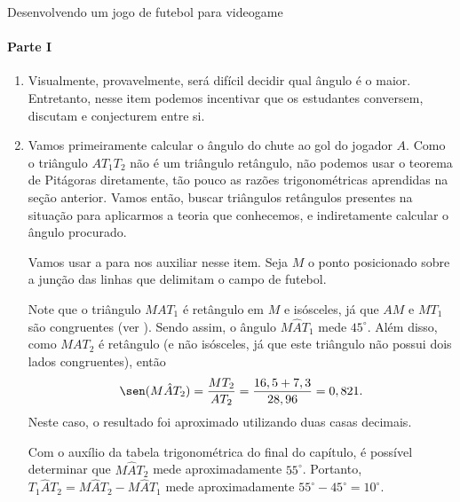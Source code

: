 \begin{answer}{Desenvolvendo um jogo de futebol para videogame}
{\paragraph{Parte I}

\begin{enumerate}\small

    \item Visualmente, provavelmente, será difícil decidir qual ângulo é o maior. Entretanto, nesse item podemos incentivar que os estudantes conversem, discutam e conjecturem entre si.
    
    \item{}
    Vamos primeiramente calcular o ângulo do chute ao gol do jogador $A$. Como o triângulo $AT_1T_2$ não é um triângulo retângulo, não podemos usar o teorema de Pitágoras diretamente, tão pouco as razões trigonométricas aprendidas na seção anterior. Vamos então, buscar triângulos retângulos presentes na situação para aplicarmos a teoria que conhecemos, e indiretamente calcular o ângulo procurado.
    
    Vamos usar a  para nos auxiliar nesse item. Seja $M$ o ponto posicionado sobre a junção das linhas que delimitam o campo de futebol.


    Note que o triângulo $MAT_1$ é retângulo em $M$ e isósceles, já que $AM$ e $MT_1$ são congruentes (ver ). Sendo assim, o ângulo $M\hat{A}T_1$ mede $45^\circ$. Além disso, como $MAT_2$ é retângulo (e não isósceles, já que este triângulo não possui dois lados congruentes), então 
    $$\sen(M\hat{A}T_2)=\frac{MT_2}{AT_2}=\frac{16,5+7,3}{28,96}=0,821.$$
    Neste caso, o resultado foi aproximado utilizando duas casas decimais.
    
    Com o auxílio da tabela trigonométrica do final do capítulo, é possível determinar que $M\hat{A}T_2$ mede aproximadamente $55^\circ$. Portanto, $T_1\hat{A}T_2=M\hat{A}T_2-M\hat{A}T_1$ mede aproximadamente $55^\circ-45^\circ=10^\circ$.
    

\end{enumerate}}
\end{answer}
